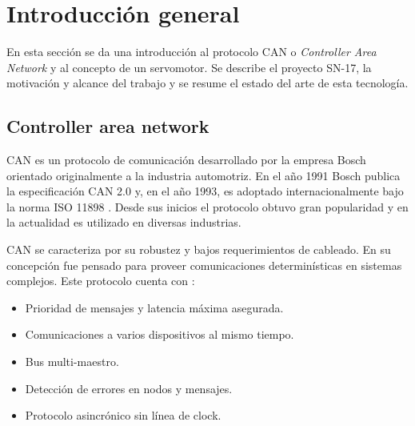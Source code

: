 
\chapter{Introducción general} %

\label{Chapter1} %
\label{IntroGeneral}


\newcommand{\keyword}[1]{\textbf{#1}}
\newcommand{\tabhead}[1]{\textbf{#1}}
\newcommand{\code}[1]{\texttt{#1}}
\newcommand{\file}[1]{\texttt{\bfseries#1}}
\newcommand{\option}[1]{\texttt{\itshape#1}}
\newcommand{\grados}{$^{\circ}$}

En esta sección se da una introducción al protocolo CAN o \textit{Controller Area Network} \citep{web_cia_can} y al concepto de un servomotor. Se describe el proyecto SN-17, la motivación y alcance del trabajo y se resume el estado del arte de esta tecnología.

\section{Controller area network}

CAN es un protocolo de comunicación desarrollado por la empresa Bosch \citep{can_basics_microchip} orientado originalmente a la industria automotriz. En el año 1991 Bosch publica la especificación CAN 2.0 y, en el año 1993, es adoptado internacionalmente bajo la norma ISO 11898 \citep{web_ISO_CAN}. Desde sus inicios el protocolo obtuvo gran popularidad y en la actualidad es utilizado en diversas industrias.

CAN se caracteriza por su robustez y bajos requerimientos de cableado. En su concepción fue pensado para proveer comunicaciones determinísticas en sistemas complejos. Este protocolo cuenta con \citep{UnderstandingCAN}:
\begin{itemize}
	\item Prioridad de mensajes y latencia máxima asegurada.
	\item Comunicaciones a varios dispositivos al mismo tiempo.	
	\item Bus multi-maestro.
	\item Detección de errores en nodos y mensajes.
	\item Protocolo asincrónico sin línea de clock.
\end{itemize}

